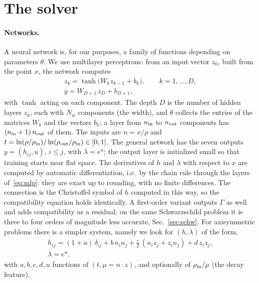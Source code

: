 \documentclass[aps,prd,twocolumn,superscriptaddress, nofootinbib,floatfix]{revtex4-2}
\begin{document}
\section{The solver}\label{sec:code}

\paragraph{Networks.} A neural network is, for our purposes, a family of functions depending on parameters $\theta$.
We use multilayer perceptrons: from an input vector $z_0$, built from the point $x$, the network computes
\begin{gather}
  z_k = \tanh\bigl(W_k z_{k-1} + b_k\bigr),\qquad k = 1,\dots,D, \nonumber\\
  y = W_{D+1}\,z_D + b_{D+1},
  \label{eq:mlp}
\end{gather}
with $\tanh$ acting on each component.
The depth $D$ is the number of hidden layers $z_k$, each with $N_w$ components (the width), and $\theta$ collects the entries of the matrices $W_k$ and the vectors $b_k$; a layer from $n_{\rm in}$ to $n_{\rm out}$ components has $(n_{\rm in}+1)\,n_{\rm out}$ of them.
The inputs are $n = x/\rho$ and $t = \ln(\rho/\rho_{\rm in})/\ln(\rho_{\rm out}/\rho_{\rm in})\in[0,1]$.
The general network has the seven outputs $y = (h_{ij}, u)$, $i\le j$, with $\lambda = e^u$; the output layer is initialized small so that training starts near flat space.
The derivatives of $h$ and $\lambda$ with respect to $x$ are computed by automatic differentiation, i.e.\ by the chain rule through the layers of~\eqref{eq:mlp}: they are exact up to rounding, with no finite differences.
The connection is the Christoffel symbol of $h$ computed in this way, so the compatibility equation holds identically.
A first-order variant outputs $\Gamma$ as well and adds compatibility as a residual; on the same Schwarzschild problem it is three to four orders of magnitude less accurate, Sec.~\ref{sec:schw}.
For axisymmetric problems there is a simpler system, namely we look for $(h, \lambda)$ of the form,
\begin{gather}
  h_{ij} = (1+a)\,\delta_{ij} + b\, n_in_j + \tfrac{c}{2}\,(n_iz_j+z_in_j) + d\, z_iz_j ,
  \nonumber\\
  \lambda = e^{u} ,
  \label{eq:axisym}
\end{gather}
with $a,b,c,d,u$ functions of $(t,\mu=n\cdot z)$, and optionally of $\rho_{\rm in}/\rho$ (the decay feature).
\end{document}
